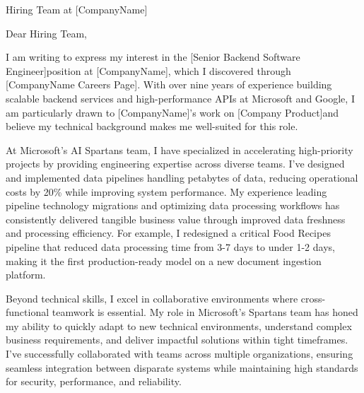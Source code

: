 
\newcommand{\COMPANY}{[CompanyName]}
\newcommand{\POSITION}{[Senior Backend Software Engineer]}
\newcommand{\SOURCE}{[CompanyName Careers Page]}
\newcommand{\PRODUCT}{[Company Product]}
\newcommand{\SPECIFICREASON}{[A Good reason to join the compnay]}
\newcommand{\RELEVANTTECHNOLOGY}{[A different Relevant technology from the company different from \PRODUCT]}
\newcommand{\TEAMNAME}{[Team Name if available]}

\noindent Hiring Team at \COMPANY
\vspace{0.4cm}

\noindent Dear Hiring Team,
\vspace{0.4cm}

I am writing to express my interest in the \POSITION position at \COMPANY, which I discovered through \SOURCE. With over nine years of experience building scalable backend services and high-performance APIs at Microsoft and Google, I am particularly drawn to \COMPANY's work on \PRODUCT and believe my technical background makes me well-suited for this role.
\vspace{0.2cm}

At Microsoft's AI Spartans team, I have specialized in accelerating high-priority projects by providing engineering expertise across diverse teams. I've designed and implemented data pipelines handling petabytes of data, reducing operational costs by 20\% while improving system performance. My experience leading pipeline technology migrations and optimizing data processing workflows has consistently delivered tangible business value through improved data freshness and processing efficiency. For example, I redesigned a critical Food Recipes pipeline that reduced data processing time from 3-7 days to under 1-2 days, making it the first production-ready model on a new document ingestion platform.
\vspace{0.2cm}

Beyond technical skills, I excel in collaborative environments where cross-functional teamwork is essential. My role in Microsoft's Spartans team has honed my ability to quickly adapt to new technical environments, understand complex business requirements, and deliver impactful solutions within tight timeframes. I've successfully collaborated with teams across multiple organizations, ensuring seamless integration between disparate systems while maintaining high standards for security, performance, and reliability.
\vspace{0.2cm}

